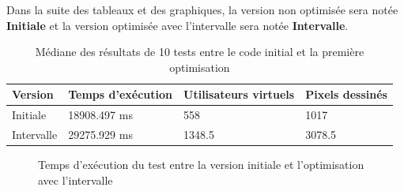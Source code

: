 Dans la suite des tableaux et des graphiques, la version non optimisée sera notée \textbf{Initiale} et la version optimisée avec l'intervalle sera notée \textbf{Intervalle}.







\begin{table}[H]
  \centering
  \begin{tabular}{|l|l|l|l|}
    \hline
    \textbf{Version} & \textbf{Temps d'exécution} & \textbf{Utilisateurs virtuels} & \textbf{Pixels dessinés} \\ \hline
    Initiale         & 18908.497 ms               & 558                            & 1017                     \\ \hline
    Intervalle       & 29275.929 ms               & 1348.5                         & 3078.5                   \\ \hline
  \end{tabular}
  \caption{Médiane des résultats de 10 tests entre le code initial et la première optimisation}
  \label{table:first-opti-results}
\end{table}

\begin{figure}[H]
  \centering
  \caption{Temps d'exécution du test entre la version initiale et l'optimisation avec l'intervalle}
  \label{fig:chart-opti-initial-interval-duration}
\end{figure}

